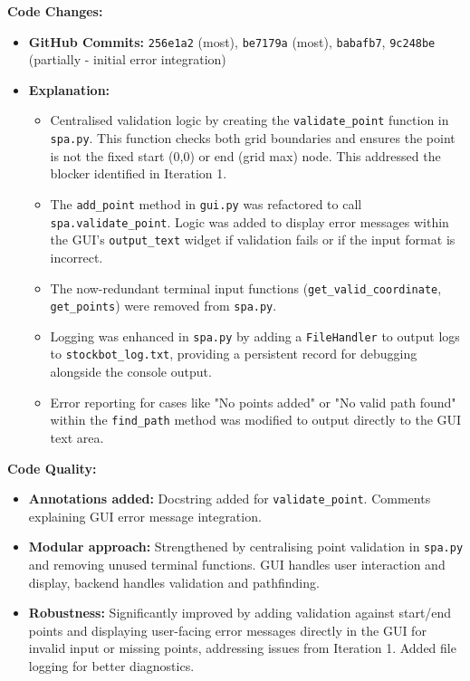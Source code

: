 \textbf{Code Changes:}
\begin{itemize}
	\item \textbf{GitHub Commits:} \verb|256e1a2| (most), \verb|be7179a| (most), \verb|babafb7|, \verb|9c248be| (partially - initial error integration)
	\item \textbf{Explanation:}
	\begin{itemize}
		\item Centralised validation logic by creating the \verb|validate_point| function in \verb|spa.py|. This function checks both grid boundaries and ensures the point is not the fixed start (0,0) or end (grid max) node. This addressed the blocker identified in Iteration 1.
		\item The \verb|add_point| method in \verb|gui.py| was refactored to call \verb|spa.validate_point|. Logic was added to display error messages within the GUI's \verb|output_text| widget if validation fails or if the input format is incorrect.
		\item The now-redundant terminal input functions (\verb|get_valid_coordinate|, \verb|get_points|) were removed from \verb|spa.py|.
		\item Logging was enhanced in \verb|spa.py| by adding a \verb|FileHandler| to output logs to \verb|stockbot_log.txt|, providing a persistent record for debugging alongside the console output.
		\item Error reporting for cases like "No points added" or "No valid path found" within the \verb|find_path| method was modified to output directly to the GUI text area.
	\end{itemize}
\end{itemize}

\textbf{Code Quality:}
\begin{itemize}
	\item \textbf{Annotations added:} Docstring added for \verb|validate_point|. Comments explaining GUI error message integration.
	\item \textbf{Modular approach:} Strengthened by centralising point validation in \verb|spa.py| and removing unused terminal functions. GUI handles user interaction and display, backend handles validation and pathfinding.
	\item \textbf{Robustness:} Significantly improved by adding validation against start/end points and displaying user-facing error messages directly in the GUI for invalid input or missing points, addressing issues from Iteration 1. Added file logging for better diagnostics.
\end{itemize}


